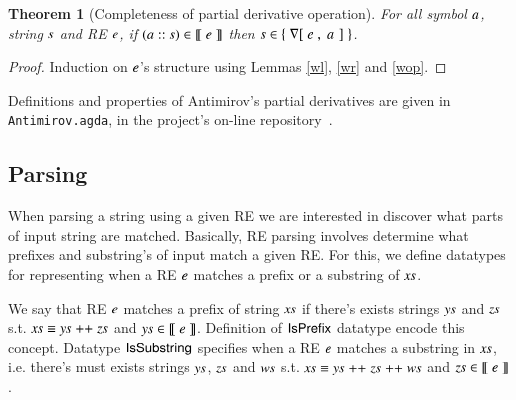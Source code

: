 \documentclass[review]{elsarticle}
\newtheorem{Theorem}{Theorem}
\newcommand{\D}[1]{\blue{\mathsf{#1}}}
\newcommand{\F}[1]{\green{\mathsf{#1}}}
\newcommand{\V}[1]{\purple{\mathit{#1}}}
\begin{document}
\begin{Theorem}[Completeness of partial derivative operation]
For all symbol \ensuremath{\V{a}}, string \ensuremath{\V{s}} and RE \ensuremath{\V{e}}, if \ensuremath{(\V{a}\;\V{::}\;\V{s})\;\D{\in\llbracket}\;\V{e}\;\D{\rrbracket}} then \ensuremath{\V{s}\;\D{\in\{}\;\F{\nabla[}\;\V{e}\;\red{,}\,\;\V{a}\;\mskip1.5mu]\;\D{\}}}.
\end{Theorem}
\begin{proof}
  Induction on \ensuremath{\V{e}}'s structure using Lemmas \ref{wl}, \ref{wr} and \ref{wop}.
\end{proof}

Definitions and properties of Antimirov's partial derivatives are given in
\texttt{Antimirov.agda}, in the project's on-line
repository~\cite{regex-rep}.

\subsection{Parsing}

When parsing a string using a given RE we are interested in discover what parts of
input string are matched. Basically, RE parsing involves determine what prefixes and
substring's of input match a given RE. For this, we define datatypes for representing
when a RE \ensuremath{\V{e}} matches a prefix or a substring of \ensuremath{\V{xs}}.


We say that RE \ensuremath{\V{e}} matches a prefix of string \ensuremath{\V{xs}} if there's exists strings \ensuremath{\V{ys}} and
\ensuremath{\V{zs}} s.t. \ensuremath{\V{xs}\;\D{\equiv}\;\V{ys}\;\F{++}\;\V{zs}} and \ensuremath{\V{ys}\;\D{\in\llbracket}\;\V{e}\;\D{\rrbracket}}. Definition of \ensuremath{\D{IsPrefix}} datatype encode
this concept. Datatype \ensuremath{\D{IsSubstring}} specifies when a RE \ensuremath{\V{e}} matches a substring in \ensuremath{\V{xs}},
i.e. there's must exists strings \ensuremath{\V{ys}}, \ensuremath{\V{zs}} and \ensuremath{\V{ws}} s.t. \ensuremath{\V{xs}\;\D{\equiv}\;\V{ys}\;\F{++}\;\V{zs}\;\F{++}\;\V{ws}} and
\ensuremath{\V{zs}\;\D{\in\llbracket}\;\V{e}\;\D{\rrbracket}}.
\end{document}
